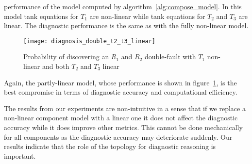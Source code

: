 performance of the model computed by
algorithm~\ref{alg:compose_model}. In this model tank equations for
$T_1$ are non-linear while tank equations for $T_2$ and $T_3$ are
linear. The diagnostic performance is the same as with the fully
non-linear model.
%
\begin{figure}[htb]
  \centering
  \texttt{[image: diagnosis\_double\_t2\_t3\_linear]}
  \caption{Probability of discovering an $R_1$ and $R_2$ double-fault with $T_1$ non-linear and both $T_2$ and $T_3$ linear}
  \label{fig:diagnosis_double_t2_t3_linear}
\end{figure}
\par
%
Again, the partly-linear model, whose performance is shown in
figure~\ref{fig:diagnosis_double_t2_t3_linear}, is the best
compromise in terms of diagnostic accuracy and computational
efficiency.
\par
The results from our experiments are non-intuitive in a sense that
if we replace a non-linear component model with a linear one it does
not affect the diagnostic accuracy while it does improve other
metrics. This cannot be done mechanically for all components as the
diagnostic accuracy may deteriorate suddenly. Our results indicate
that the role of the topology for diagnostic reasoning is important.

